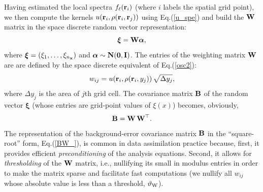 \documentclass[12pt]{article}
\newcommand{\ie}{i.e., }
\begin{document}
Having estimated the local spectra $f_\ell({\bf r}_i)$ (where $i$ labels the spatial grid point), 
we then compute the kernels $u({\bf r}_i, \rho({\bf r}_i,{\bf r}_j))$
using Eq.(\ref{u_spe}) and build the ${\bf W}$ matrix in the space discrete random vector
representation:
%
\begin {equation}
\label{osc2dm}
\boldsymbol\xi  = {\bf W} \boldsymbol\alpha,
\end {equation}
%
where $\boldsymbol\xi = (\xi_1, \dots, \xi_{n_{\bf x}})$ and
$\boldsymbol\alpha \sim {\bf N}({\bf 0,I})$.
The entries of the weighting matrix  ${\bf W}$ are
are defined by the space discrete equivalent of Eq.(\ref{osc2}):
%
\begin {equation}
\label{wij}
w_{ij} = u({\bf r}_i, \rho({\bf r}_i, y_j)) \,\sqrt{\Delta y_j},
\end {equation}
%
where $\Delta y_j$ is the area of $j$th grid cell.
The covariance matrix ${\bf B}$ of the random vector $\boldsymbol\xi$ (whose entries
are grid-point values of $\xi(x)$) becomes, obviously,
%
\begin {equation}
\label{BW_}
{\bf B} = {\bf W} \,{\bf W}^\top.
\end {equation}
%
The representation of the background-error covariance matrix ${\bf B}$ in the ``square-root'' form, Eq.(\ref{BW_}),
is common in data assimilation practice because, first, it provides efficient {\em preconditioning} of the analysis equations. 
Second, it allows for {\em thresholding} of the ${\bf W}$ matrix, \ie
nullifying its small in modulus entries in order to make the matrix sparse and
facilitate fast computations
(we nullify  all ${w}_{ij}$ whose 
absolute value is less than a threshold, $\vartheta_{\rm W}$).
\end{document}
